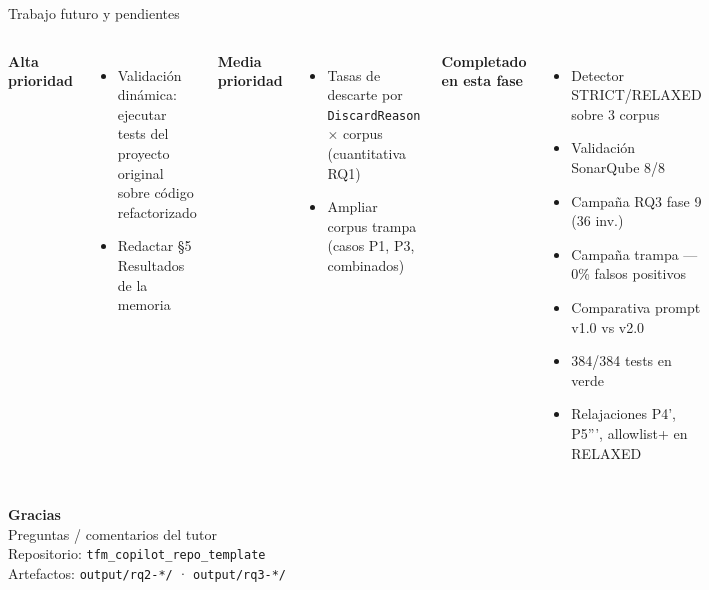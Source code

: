 \documentclass[aspectratio=169, 10pt]{beamer}
\newcommand{\ok}[1]{\textcolor{okgreen}{\textbf{#1}}}
\begin{document}
\begin{frame}{Trabajo futuro y pendientes}
  \begin{columns}[T]
      \textbf{Alta prioridad}
      \begin{itemize}
        \item Validación dinámica: ejecutar tests del proyecto original sobre
              código refactorizado
        \item Redactar §5 Resultados de la memoria
      \end{itemize}

      \vspace{0.8em}
      \textbf{Media prioridad}
      \begin{itemize}
        \item Tasas de descarte por \texttt{DiscardReason} $\times$ corpus
              (cuantitativa RQ1)
        \item Ampliar corpus trampa (casos P1, P3, combinados)
      \end{itemize}

      \textbf{Completado en esta fase}
      \begin{itemize}
        \item[\ok{✓}] Detector STRICT/RELAXED sobre 3 corpus
        \item[\ok{✓}] Validación SonarQube 8/8
        \item[\ok{✓}] Campaña RQ3 fase 9 (36 inv.)
        \item[\ok{✓}] Campaña trampa --- 0\% falsos positivos
        \item[\ok{✓}] Comparativa prompt v1.0 vs v2.0
        \item[\ok{✓}] 384/384 tests en verde
        \item[\ok{✓}] Relajaciones P4', P5''', allowlist+ en RELAXED
      \end{itemize}
  \end{columns}
\end{frame}

\begin{frame}
  \centering
  \vspace{1.5cm}
  {\Large \textbf{Gracias}}\\[0.8em]
  {\normalsize Preguntas / comentarios del tutor}\\[2em]
  \footnotesize
  Repositorio: \texttt{tfm\_copilot\_repo\_template}\\
  Artefactos: \texttt{output/rq2-*/} · \texttt{output/rq3-*/}
\end{frame}
\end{document}
